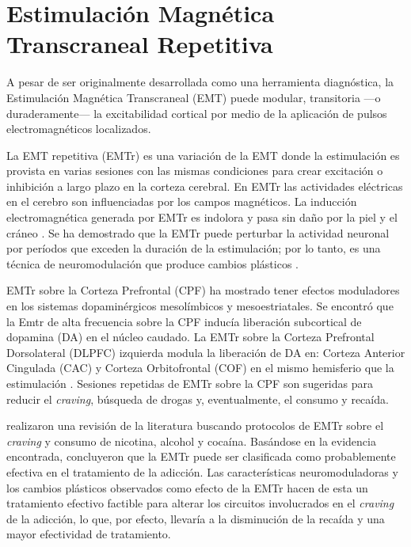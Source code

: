 \section{Estimulación Magnética Transcraneal Repetitiva}
A pesar de ser originalmente desarrollada como una herramienta diagnóstica, la Estimulación Magnética Transcraneal (EMT) puede modular, transitoria ---o duraderamente--- la excitabilidad cortical por medio de la aplicación de pulsos electromagnéticos localizados\parencite{Horvath2011a}.\par
La EMT repetitiva (EMTr) es una variación de la EMT donde la estimulación es provista en varias sesiones con las mismas condiciones para crear excitación o inhibición a largo plazo en la corteza cerebral.
En EMTr las actividades eléctricas en el cerebro son influenciadas por los campos magnéticos. La inducción electromagnética generada por EMTr es indolora y pasa sin daño por la piel y el cráneo \parencite{Noohi2016}.
Se ha demostrado que la EMTr puede perturbar la actividad neuronal por períodos que exceden la duración de la estimulación; por lo tanto, es una técnica de neuromodulación que produce cambios plásticos \parencite{Horvath2011a}.\par
EMTr sobre la Corteza Prefrontal (CPF) ha mostrado tener efectos moduladores en los sistemas dopaminérgicos mesolímbicos y mesoestriatales.
Se encontró que la Emtr de alta frecuencia sobre la CPF inducía liberación subcortical de dopamina (DA) en el núcleo caudado\parencite{Strafella2001}.
La EMTr sobre la Corteza Prefrontal Dorsolateral (DLPFC) izquierda modula la liberación de DA en: Corteza Anterior Cingulada (CAC) y Corteza Orbitofrontal (COF) en el mismo hemisferio que la estimulación \parencite{Cho2009}.
Sesiones repetidas de EMTr sobre la CPF son sugeridas para reducir el \textit{craving}, búsqueda de drogas y, eventualmente, el consumo y recaída\parencite{Amiaz2009}.\par
\textcite{Bellamoli2014a} realizaron una revisión de la literatura buscando protocolos de EMTr sobre el \textit{craving} y consumo de nicotina, alcohol y cocaína. Basándose en la evidencia encontrada, concluyeron que la EMTr puede ser clasificada como probablemente efectiva en el tratamiento de la adicción.
Las características neuromoduladoras y los cambios plásticos observados como efecto de la EMTr hacen de esta un tratamiento efectivo factible para alterar los circuitos involucrados en el \textit{craving} de la adicción, lo que, por efecto, llevaría a la disminución de la recaída y una mayor efectividad de tratamiento.

